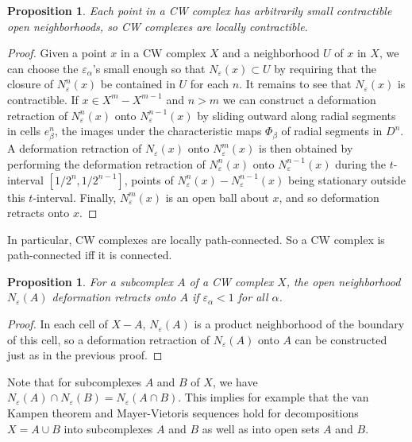 \documentclass{article}
\newtheorem{proposition}[theorem]{Proposition}
\theoremstyle{definition}
\begin{document}
\begin{proposition}
Each point in a CW complex has arbitrarily small contractible open neighborhoods, so CW complexes are locally contractible.
\end{proposition}

\begin{proof}
Given a point $x$ in a CW complex $X$ and a neighborhood $U$ of $x$ in $X$, we can choose the $\varepsilon_{\alpha}$'s small enough so that $N_{\varepsilon}(x) \subset U$ by requiring that the closure of $N_{\varepsilon}^{n}(x)$ be contained in $U$ for each $n$. It remains to see that $N_{\varepsilon}(x)$ is contractible. If $x \in X^{m} - X^{m-1}$ and $n > m$ we can construct a deformation retraction of $N_{\varepsilon}^{n}(x)$ onto $N_{\varepsilon}^{n-1}(x)$ by sliding outward along radial segments in cells $e_{\beta}^{n}$, the images under the characteristic maps $\Phi_{\beta}$ of radial segments in $D^{n}$. A deformation retraction of $N_{\varepsilon}(x)$ onto $N_{\varepsilon}^{m}(x)$ is then obtained by performing the deformation retraction of $N_{\varepsilon}^{n}(x)$ onto $N_{\varepsilon}^{n-1}(x)$ during the $t$-interval $[1/2^{n}, 1/2^{n-1}]$, points of $N_{\varepsilon}^{n}(x) - N_{\varepsilon}^{n-1}(x)$ being stationary outside this $t$-interval. Finally, $N_{\varepsilon}^{m}(x)$ is an open ball about $x$, and so deformation retracts onto $x$.
\end{proof}

In particular, CW complexes are locally path-connected. So a CW complex is path-connected iff it is connected.

\begin{proposition}
For a subcomplex $A$ of a CW complex $X$, the open neighborhood $N_{\varepsilon}(A)$ deformation retracts onto $A$ if $\varepsilon_{\alpha} < 1$ for all $\alpha$.
\end{proposition}

\begin{proof}
In each cell of $X - A$, $N_{\varepsilon}(A)$ is a product neighborhood of the boundary of this cell, so a deformation retraction of $N_{\varepsilon}(A)$ onto $A$ can be constructed just as in the previous proof.
\end{proof}

Note that for subcomplexes $A$ and $B$ of $X$, we have $N_{\varepsilon}(A) \cap N_{\varepsilon}(B) = N_{\varepsilon}(A \cap B)$. This implies for example that the van Kampen theorem and Mayer-Vietoris sequences hold for decompositions $X = A \cup B$ into subcomplexes $A$ and $B$ as well as into open sets $A$ and $B$.
\end{document}
